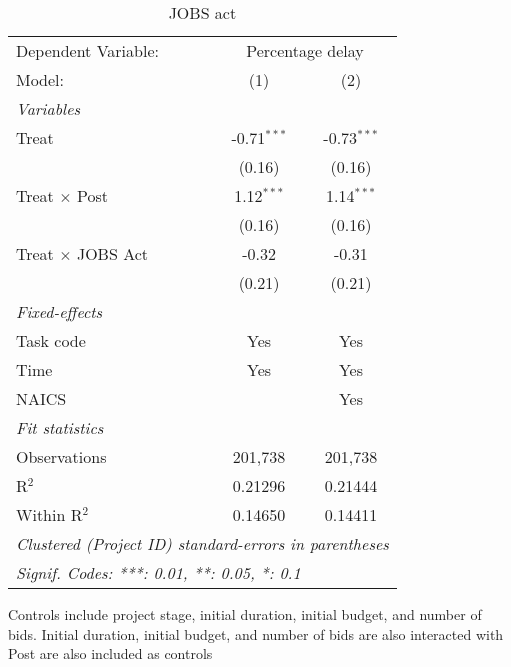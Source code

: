 \documentclass[
]{article}
\begin{document}
\begin{table}[htbp]
   \caption{JOBS act}
   \centering
   \begin{tabular}{lcc}
      \tabularnewline \midrule \midrule
      Dependent Variable: & \multicolumn{2}{c}{Percentage delay}\\
      Model:                   & (1)           & (2)\\  
      \midrule
      \emph{Variables}\\
      Treat                    & -0.71$^{***}$ & -0.73$^{***}$\\   
                               & (0.16)        & (0.16)\\   
      Treat $\times$ Post      & 1.12$^{***}$  & 1.14$^{***}$\\   
                               & (0.16)        & (0.16)\\   
      Treat $\times$ JOBS Act  & -0.32         & -0.31\\   
                               & (0.21)        & (0.21)\\   
      \midrule
      \emph{Fixed-effects}\\
      Task code                & Yes           & Yes\\  
      Time                     & Yes           & Yes\\  
      NAICS                    &               & Yes\\  
      \midrule
      \emph{Fit statistics}\\
      Observations             & 201,738       & 201,738\\  
      R$^2$                    & 0.21296       & 0.21444\\  
      Within R$^2$             & 0.14650       & 0.14411\\  
      \midrule \midrule
      \multicolumn{3}{l}{\emph{Clustered (Project ID) standard-errors in parentheses}}\\
      \multicolumn{3}{l}{\emph{Signif. Codes: ***: 0.01, **: 0.05, *: 0.1}}\\
   \end{tabular}
   
   \par \raggedright 
   Controls include project stage, initial duration, initial budget, and number of bids. Initial duration, initial budget, and number of bids are also interacted with Post are also included as controls
\end{table}
\end{document}
